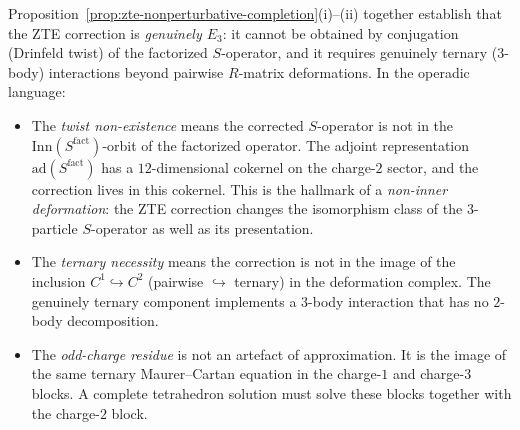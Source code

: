 \begin{remark}
\label{rem:zte-genuinely-e3}
Proposition~\ref{prop:zte-nonperturbative-completion}(i)--(ii) together establish that the ZTE correction is \emph{genuinely $E_3$}: it cannot be obtained by conjugation (Drinfeld twist) of the factorized $S$-operator, and it requires genuinely ternary ($3$-body) interactions beyond pairwise $R$-matrix deformations. In the operadic language:

\begin{itemize}
 \item The \emph{twist non-existence} means the corrected $S$-operator is not in the $\mathrm{Inn}(S^{\mathrm{fact}})$-orbit of the factorized operator. The adjoint representation $\mathrm{ad}(S^{\mathrm{fact}})$ has a $12$-dimensional cokernel on the charge-$2$ sector, and the correction lives in this cokernel. This is the hallmark of a \emph{non-inner deformation}: the ZTE correction changes the isomorphism class of the $3$-particle $S$-operator as well as its presentation.

 \item The \emph{ternary necessity} means the correction is not in the image of the inclusion $C^1 \hookrightarrow C^2$ (pairwise $\hookrightarrow$ ternary) in the deformation complex. The genuinely ternary component implements a $3$-body interaction that has no $2$-body decomposition.

 \item The \emph{odd-charge residue} is not an artefact of approximation. It is the image of the same ternary Maurer--Cartan equation in the charge-$1$ and charge-$3$ blocks. A complete tetrahedron solution must solve these blocks together with the charge-$2$ block.
\end{itemize}
\end{remark}

